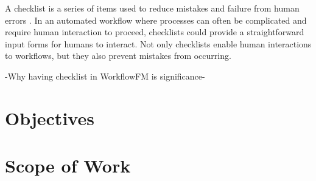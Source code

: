 


A checklist is a series of items used to reduce mistakes and failure from human errors \cite{whatischecklist}.
In an automated workflow where processes can often be complicated and require human interaction to proceed, checklists could provide a straightforward input forms for humans to interact. Not only checklists enable human interactions to workflows, but they also prevent mistakes from occurring.

-Why having checklist in WorkflowFM is significance-





\section{Objectives}


\section{Scope of Work}